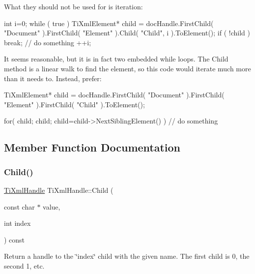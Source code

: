 What they should not be used for is iteration\+:

\begin{DoxyVerb}int i=0; 
while ( true )
{
    TiXmlElement* child = docHandle.FirstChild( "Document" ).FirstChild( "Element" ).Child( "Child", i ).ToElement();
    if ( !child )
        break;
    // do something
    ++i;
}
\end{DoxyVerb}


It seems reasonable, but it is in fact two embedded while loops. The Child method is a linear walk to find the element, so this code would iterate much more than it needs to. Instead, prefer\+:

\begin{DoxyVerb}TiXmlElement* child = docHandle.FirstChild( "Document" ).FirstChild( "Element" ).FirstChild( "Child" ).ToElement();

for( child; child; child=child->NextSiblingElement() )
{
    // do something
}
\end{DoxyVerb}
 

\subsection{Member Function Documentation}
\mbox{\label{class_ti_xml_handle_a9903b035444ee36450fe00ede403f920}} 
\subsubsection{\texorpdfstring{Child()}{Child()}\hspace{0.1cm}{\footnotesize\ttfamily [1/2]}}
{\footnotesize\ttfamily \hyperlink{class_ti_xml_handle}{Ti\+Xml\+Handle} Ti\+Xml\+Handle\+::\+Child (\begin{DoxyParamCaption}\item[{const char $\ast$}]{value,  }\item[{int}]{index }\end{DoxyParamCaption}) const}

Return a handle to the \char`\"{}index\char`\"{} child with the given name. The first child is 0, the second 1, etc. \mbox{\label{class_ti_xml_handle_a32585942abb28e03eea9c5223f38a659}} 
